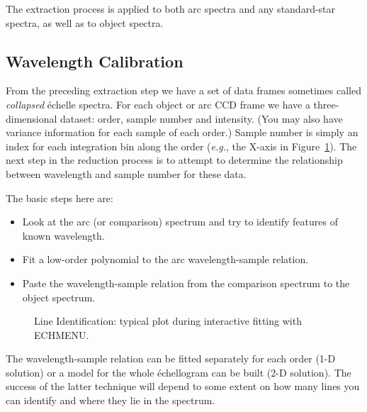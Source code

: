 \documentclass[twoside,11pt]{article}
\newcommand{\xlabel}[1]{}
\newcommand{\sgspec}[2]{#1}
\newcommand{\sgspec}[2]{#2}
\begin{document}
The extraction process is applied to both arc spectra and any
standard-star spectra, as well as to object spectra.


\subsection{\label{se_wavelen_cal}\xlabel{wavelen_cal}Wavelength Calibration}

From the preceding extraction step we have a set of data frames
sometimes called {\sl collapsed} \'{e}chelle spectra.  For each object
or arc CCD frame we have a three-dimensional dataset: order, sample
number and intensity.  (You may also have variance information for each
sample of each order.)  Sample number is simply an index for each
integration bin along the order ({\em{e.g.}}, the X-axis in
\sgspec{Figure~\ref{fi_echarc_plot}}{the figure below}).
The next step in the reduction process is to attempt to determine the
relationship between wavelength and sample number for these data.

The basic steps here are:

\begin{itemize}

\item Look at the arc (or comparison) spectrum and try to identify
      features of known wavelength.

\item Fit a low-order polynomial to the arc wavelength-sample relation.

\item Paste the wavelength-sample relation from the comparison spectrum
      to the object spectrum.

\end{itemize}

\begin{figure}
\begin{center}
\sgspec{\leavevmode\epsfysize=105mm\epsfbox{sg9_03.eps}}
{\leavevmode\epsfysize=136mm}

\parbox{140mm}{
\caption{Line Identification: typical plot during interactive fitting
         with ECHMENU.}
\label{fi_echarc_plot}
}
\end{center}
\end{figure}

The wavelength-sample relation can be fitted separately for each order
(1-D solution) or a model for the whole \'{e}chellogram can be built
(2-D solution)\@.  The success of the latter technique will depend to
some extent on how many lines you can identify and where they lie in
the spectrum.
\end{document}
